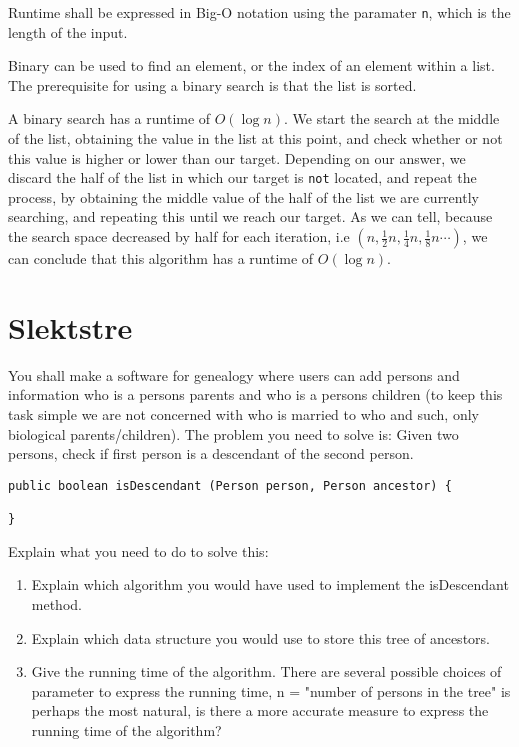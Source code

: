 \documentclass{article}
\begin{document}
    Runtime shall be expressed in Big-O notation using the paramater \texttt{n}, which is the length of the input.

    \begin{ans}
        Binary can be used to find an element, or the index of an element within a list. The prerequisite for using a binary search is that the list is sorted.
        \medskip

    A binary search has a runtime of \( O\left( \log n \right) \). We start the search at the middle of the list, obtaining the value in the list at this point, and check whether or not this value is higher or lower than our target. Depending on our answer, we discard the half of the list in which our target is \texttt{not} located, and repeat the process, by obtaining the middle value of the half of the list we are currently searching, and repeating this until we reach our target. As we can tell, because the search space decreased by half for each iteration, i.e \( (n, \frac{1}{2} n, \frac{1}{4} n, \frac{1}{8} n \cdots ) \), we can conclude that this algorithm has a runtime of \( O\left( \log n  \right) \).
    \end{ans}

    \section{Slektstre}

    You shall make a software for genealogy where users can add persons and information who is a persons parents and who is a persons children (to keep this task simple we are not concerned with who is married to who and such, only biological parents/children). The problem you need to solve is: Given two persons, check if first person is a descendant of the second person.

    \begin{lstlisting}
public boolean isDescendant (Person person, Person ancestor) {
    
}
    \end{lstlisting}

    Explain what you need to do to solve this:
    \begin{enumerate}
        \item Explain which algorithm you would have used to implement the isDescendant method.
    \item Explain which data structure you would use to store this tree of ancestors.    
    \item Give the running time of the algorithm. There are several possible choices of parameter to express the running time, n = "number of persons in the tree" is perhaps the most natural, is there a more accurate measure to express the running time of the algorithm?
    \end{enumerate}
\end{document}
